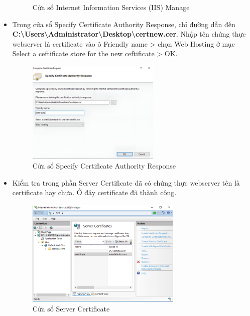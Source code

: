 \documentclass[13pt]{report}
\begin{document}
\begin{itemize}
\begin{figure}[htp]
			\caption{Cửa sổ Internet Information Services (IIS) Manage}
		\end{figure}
		\item Trong cửa sổ Specify Certificate Authority Response, chỉ đường dẫn đến \textbf{C:\textbackslash Users\textbackslash Administrator\textbackslash Desktop\textbackslash certnew.cer}. Nhập tên chứng thực webserver là certificate vào ô Friendly name > chọn Web Hosting ở mục Select a ceftificate store for the new ceftificate > OK.
		\begin{figure}[htp]
			\centering
			\includegraphics[width=0.6\textwidth]{image/Gui/SSL/15.png}
			\caption{Cửa sổ Specify Certificate Authority Response}
		\end{figure}
		\newpage
		\item Kiểm tra trong phần Server Certificate đã có chứng thực webserver tên là certificate hay chưa. Ở đây certificate đã thành công.
		\begin{figure}[htp]
			\centering
			\includegraphics[width=0.7\textwidth]{image/Gui/SSL/16.png}
			\caption{Cửa sổ Server Certificate}
		\end{figure}
	\end{itemize}
\end{document}
